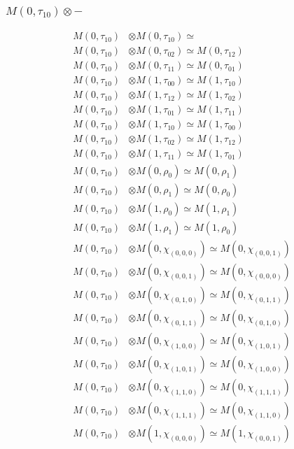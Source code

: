 \subsubsection{$ M(0,\tau_{10})\otimes -$}
\begin{align*}
M(0,\tau_{10}) &\otimes M(0,\tau_{10}) \simeq  \\
M(0,\tau_{10}) &\otimes M(0,\tau_{02}) \simeq M(0,\tau_{12}) \\
M(0,\tau_{10}) &\otimes M(0,\tau_{11}) \simeq M(0,\tau_{01}) \\
M(0,\tau_{10}) &\otimes M(1,\tau_{00}) \simeq M(1,\tau_{10}) \\
M(0,\tau_{10}) &\otimes M(1,\tau_{12}) \simeq M(1,\tau_{02}) \\
M(0,\tau_{10}) &\otimes M(1,\tau_{01}) \simeq M(1,\tau_{11}) \\
M(0,\tau_{10}) &\otimes M(1,\tau_{10}) \simeq M(1,\tau_{00}) \\
M(0,\tau_{10}) &\otimes M(1,\tau_{02}) \simeq M(1,\tau_{12}) \\
M(0,\tau_{10}) &\otimes M(1,\tau_{11}) \simeq M(1,\tau_{01}) \\
M(0,\tau_{10}) &\otimes M(0,\rho_{0}) \simeq M(0,\rho_{1}) \\
M(0,\tau_{10}) &\otimes M(0,\rho_{1}) \simeq M(0,\rho_{0}) \\
M(0,\tau_{10}) &\otimes M(1,\rho_{0}) \simeq M(1,\rho_{1}) \\
M(0,\tau_{10}) &\otimes M(1,\rho_{1}) \simeq M(1,\rho_{0}) \\
M(0,\tau_{10}) &\otimes M(0,\chi_{(0,0,0)}) \simeq M(0,\chi_{(0,0,1)}) \\
M(0,\tau_{10}) &\otimes M(0,\chi_{(0,0,1)}) \simeq M(0,\chi_{(0,0,0)}) \\
M(0,\tau_{10}) &\otimes M(0,\chi_{(0,1,0)}) \simeq M(0,\chi_{(0,1,1)}) \\
M(0,\tau_{10}) &\otimes M(0,\chi_{(0,1,1)}) \simeq M(0,\chi_{(0,1,0)}) \\
M(0,\tau_{10}) &\otimes M(0,\chi_{(1,0,0)}) \simeq M(0,\chi_{(1,0,1)}) \\
M(0,\tau_{10}) &\otimes M(0,\chi_{(1,0,1)}) \simeq M(0,\chi_{(1,0,0)}) \\
M(0,\tau_{10}) &\otimes M(0,\chi_{(1,1,0)}) \simeq M(0,\chi_{(1,1,1)}) \\
M(0,\tau_{10}) &\otimes M(0,\chi_{(1,1,1)}) \simeq M(0,\chi_{(1,1,0)}) \\
M(0,\tau_{10}) &\otimes M(1,\chi_{(0,0,0)}) \simeq M(1,\chi_{(0,0,1)}) \\

\end{align*}
